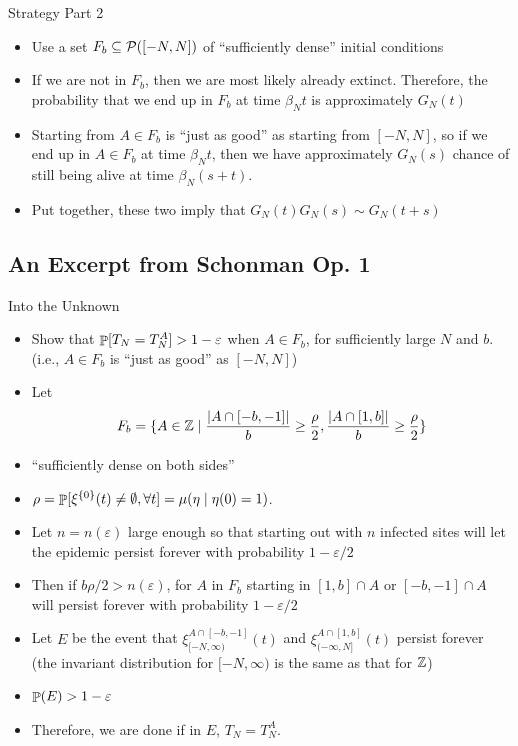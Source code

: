 \documentclass{beamer}
\newcommand{\ep}{\varepsilon}
\begin{document}
\begin{frame}{Strategy Part 2}
  \begin{itemize}
    \item Use a set $F_{b} \subseteq \mathcal{P}([-N,N])$ of ``sufficiently dense'' initial conditions
    \pause
    \item If we are not in $F_{b}$, then we are most likely already extinct. Therefore, the probability that we end up in $F_{b}$ at time $\beta_{N}t$ is approximately $G_{N}(t)$
    \pause
    \item Starting from $A \in F_{b}$ is ``just as good'' as starting from $[-N,N]$, so if we end up in $A \in F_{b}$ at time $\beta_{N}t$, then we have approximately $G_{N}(s)$ chance of still being alive at time $\beta_{N}(s+t)$.
    \pause
    \item Put together, these two imply that $G_{N}(t)G_{N}(s) \sim G_{N}(t+s)$
  \end{itemize}
\end{frame}

\subsection{An Excerpt from Schonman Op. 1}

\begin{frame}{Into the Unknown}
  \begin{itemize}
    \item Show that $\Prob[T_{N} = T_{N}^{A}] > 1 - \ep$ when $A \in F_{b}$, for sufficiently large $N$ and $b$. (i.e., $A \in F_{b}$ is ``just as good'' as $[-N,N]$)
    \item Let
          \[F_{b} = \{A \in \mathbb{Z} \mid \frac{\abs{A \cap [-b,-1]}}{b} \geq \frac{\rho}{2}, \frac{\abs{A \cap [1,b]}}{b} \geq \frac{\rho}{2}\}\]
    \item ``sufficiently dense on both sides''
    \item $\rho = \mathop{\mathbb{P}}[\xi^{\{0\}}(t) \neq \emptyset, \forall t] = \mu(\eta \mid \eta(0) = 1)$.
  \end{itemize}
\end{frame}

\begin{frame}
  \begin{itemize}
    \item Let $n = n(\ep)$ large enough so that starting out with $n$ infected sites will let the epidemic persist forever with probability $1 - \ep/2$
          \pause
    \item Then if $b \rho/2 > n(\ep)$, for $A$ in $F_{b}$ starting in $[1,b] \cap A$ or $[-b,-1] \cap A$ will persist forever with probability $1 - \ep/2$
          \pause
    \item Let $E$ be the event that $\xi_{[-N,\infty)}^{A\cap[-b,-1]}(t)$ and $\xi_{(-\infty,N]}^{A \cap [1,b]}(t)$ persist forever (the invariant distribution for $[-N,\infty)$ is the same as that for $\mathbb{Z}$)
          \pause
    \item $\Prob(E) > 1 - \ep$
          \pause
    \item Therefore, we are done if in $E$, $T_{N} = T_{N}^{A}$.
  \end{itemize}
\end{frame}
\end{document}
